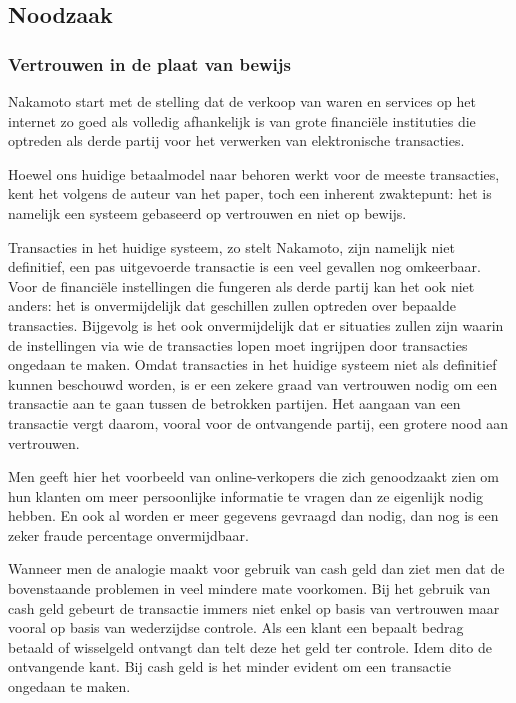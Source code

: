 	\subsection{Noodzaak}
			\subsubsection{Vertrouwen in de plaat van bewijs}
			Nakamoto start met de stelling dat de verkoop van waren en services op het internet zo goed als volledig afhankelijk is van grote financiële instituties die optreden als derde partij voor het verwerken van elektronische transacties. 
		
			Hoewel ons huidige betaalmodel naar behoren werkt voor de meeste transacties, kent het volgens de auteur van het paper, toch een inherent zwaktepunt: het is namelijk een systeem gebaseerd op vertrouwen en niet op bewijs.
			
			Transacties in het huidige systeem, zo stelt Nakamoto, zijn namelijk niet definitief, een pas uitgevoerde transactie is een veel gevallen nog omkeerbaar. Voor de financiële instellingen die fungeren als derde partij kan het ook niet anders: het is onvermijdelijk dat geschillen zullen optreden over bepaalde transacties. Bijgevolg is het ook onvermijdelijk dat er situaties zullen zijn waarin de instellingen via wie de transacties lopen moet ingrijpen door transacties ongedaan te maken. Omdat transacties in het huidige systeem niet als definitief kunnen beschouwd worden, is er een zekere graad van vertrouwen nodig om een transactie aan te gaan tussen de betrokken partijen.  Het aangaan van een transactie vergt daarom, vooral voor de ontvangende partij, een grotere nood aan vertrouwen. 
			
			Men geeft hier het voorbeeld van online-verkopers die zich genoodzaakt zien om hun klanten om meer persoonlijke informatie te vragen dan ze eigenlijk nodig hebben. En ook al worden er meer gegevens gevraagd dan nodig, dan nog is een zeker fraude percentage onvermijdbaar. 
		
			Wanneer men de analogie maakt voor gebruik van cash geld dan ziet men dat de bovenstaande problemen in veel mindere mate voorkomen. Bij het gebruik van cash geld gebeurt de transactie immers niet enkel op basis van vertrouwen maar vooral op basis van wederzijdse controle. Als een klant een bepaalt bedrag betaald of wisselgeld ontvangt dan telt deze het geld ter controle. Idem dito de ontvangende kant. Bij cash geld is het minder evident om een transactie ongedaan te maken. 
			
